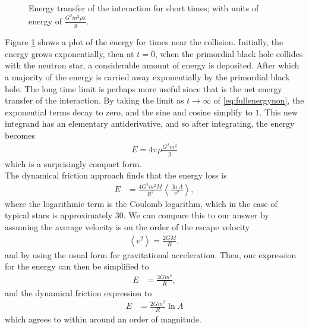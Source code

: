 \begin{figure}[p]
 
 \caption[Analytic Energy Transfer]{Energy transfer of the interaction for short times; with units of energy of $\frac{G^2 m^2 \rho \pi}{g}$.}
 \label{fig:energy}
\end{figure}

Figure \ref{fig:energy} shows a plot of the energy for times near the collision. Initially, the energy grows exponentially, then at $t=0$, when the primordial black hole collides with the neutron star, a considerable amount of energy is deposited. After which a majority of the energy is carried away exponentially by the primordial black hole. The long time limit is perhaps more useful since that is the net energy transfer of the interaction. By taking the limit as $t \rightarrow \infty$ of \eqref{eq:fullenergynon}, the exponential terms decay to zero, and the sine and cosine simplify to $1$. This new integrand has an elementary antiderivative, and so after integrating, the energy becomes
\begin{align}
\label{eq:energy}
E = 4 \pi \rho \frac{G^2 m^2}{g}
\end{align}
which is a surprisingly compact form. \\

The dynamical friction approach \cite{dynamicalfriction} finds that the energy loss is
\begin{align*}
E &= \frac{4 G^2 m^2 M}{R^2} \left< \frac{\ln \Lambda}{v^2} \right>,
\end{align*}
where the logarithmic term is the Coulomb logarithm, which in the case of typical stars is approximately $30$. We can compare this to our answer by assuming the average velocity is on the order of the escape velocity
\begin{align*}
\left< v^2 \right> = \frac{2GM}{R},
\end{align*}
and by using the usual form for gravitational acceleration. Then, our expression for the energy can then be simplified to
\begin{align*}
E &= \frac{3Gm^2}{R},
\end{align*}
and the dynamical friction expression to
\begin{align*}
E &= \frac{2Gm^2}{R} \ln \Lambda
\end{align*}
which agrees to within around an order of magnitude.




%
















